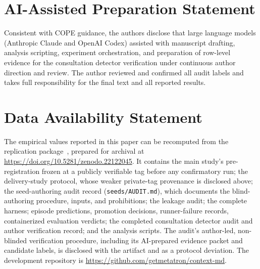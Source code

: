 \documentclass[sigconf,screen]{acmart}
\newcommand{\artifact}{\url{https://github.com/getmetatron/context-md}}
\newcommand{\artifactdoi}{\url{https://doi.org/10.5281/zenodo.22122045}}
\begin{document}
\section*{AI-Assisted Preparation Statement}
Consistent with COPE guidance, the authors disclose that large language models
(Anthropic Claude and OpenAI Codex) assisted with manuscript drafting, analysis
scripting, experiment orchestration, and preparation of row-level evidence for
the consultation detector verification under continuous author direction and
review. The author reviewed and confirmed all audit labels and takes full
responsibility for the final text and all reported results.

\balance
\section*{Data Availability Statement}
The empirical values reported in this paper can be recomputed from the replication
package~\cite{artifact}, prepared for archival at \artifactdoi. It contains the
main study's pre-registration frozen at a publicly verifiable tag before any
confirmatory run; the delivery-study protocol, whose weaker private-tag provenance
is disclosed above; the seed-authoring audit record (\texttt{seeds/AUDIT.md}),
which documents the blind-authoring procedure, inputs, and prohibitions; the
leakage audit; the complete harness; episode predictions, promotion decisions,
runner-failure records, containerized evaluation verdicts; the completed
consultation detector audit and author verification record; and the analysis
scripts. The audit's author-led, non-blinded verification procedure, including
its AI-prepared evidence packet and candidate labels, is disclosed with the
artifact and as a protocol deviation. The development repository is
\artifact.

\nocite{manifesto}  %


\end{document}
